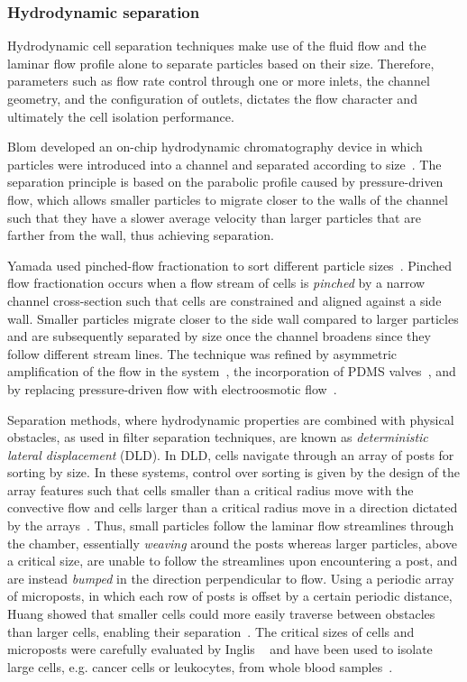 \subsubsection{Hydrodynamic separation}
Hydrodynamic cell separation techniques make use of the fluid flow and the laminar flow profile alone to separate particles based on their size. Therefore, parameters such as flow rate control through one or more inlets, the channel geometry, and the configuration of outlets, dictates the flow character and ultimately the cell isolation performance.

Blom \etal{} developed an on-chip hydrodynamic chromatography device in which particles were introduced into a channel and separated according to size~\cite{Blom2002,Blom2003}. The separation principle is based on the parabolic profile caused by pressure-driven flow, which allows smaller particles to migrate closer to the walls of the channel such that they have a slower average velocity than larger particles that are farther from the wall, thus achieving separation.  

Yamada \etal{} used pinched-flow fractionation to sort different particle sizes~\cite{Yamada2004}. Pinched flow fractionation occurs when a flow stream of cells is \textit{pinched} by a narrow channel cross-section such that cells are constrained and aligned against a side wall. Smaller particles migrate closer to the side wall compared to larger particles and are subsequently separated by size once the channel broadens since they follow different stream lines. The technique was refined by asymmetric amplification of the flow in the system~\cite{Takagi2005}, the incorporation of PDMS valves~\cite{Sai2006}, and by replacing pressure-driven flow with electroosmotic flow~\cite{Kawamata2008}.

Separation methods, where hydrodynamic properties are combined with physical obstacles, as used in filter separation techniques, are known as \textit{deterministic lateral displacement} (DLD). In DLD, cells navigate through an array of posts for sorting by size. In these systems, control over sorting is given by the design of the array features such that cells smaller than a critical radius move with the convective flow and cells larger than a critical radius move in a direction dictated by the arrays~\cite{Beech2012}. Thus, small particles follow the laminar flow streamlines through the chamber, essentially \textit{weaving} around the posts whereas larger particles, above a critical size, are unable to follow the streamlines upon encountering a post, and are instead \textit{bumped} in the direction perpendicular to flow. Using a periodic array of microposts, in which each row of posts is offset by a certain periodic distance, Huang \etal{} showed that smaller cells could more easily traverse between obstacles than larger cells, enabling their separation~\cite{Huang2004}. The critical sizes of cells and microposts were carefully evaluated by Inglis \etal{}~\cite{Inglis2006} and have been used to isolate large cells, e.g. cancer cells or leukocytes, from whole blood samples~\cite{Davis2006,Huang2008,Liu2013}.

